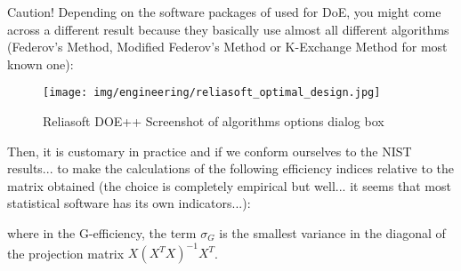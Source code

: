 	\begin{tcolorbox}[title=Remark,colframe=black,arc=10pt]
	Caution! Depending on the software packages of used for DoE, you might come across a different result because they basically use almost all different algorithms (Federov's Method, Modified Federov's Method or K-Exchange Method for most known one):
	\begin{figure}[H]
		\centering
		\texttt{[image: img/engineering/reliasoft\_optimal\_design.jpg]}
		\caption[]{Reliasoft DOE++ Screenshot of algorithms options dialog box}
	\end{figure}
	\end{tcolorbox}
	Then, it is customary in practice and if we conform ourselves to the NIST results... to make the calculations of the following efficiency indices relative to the matrix obtained (the choice is completely empirical but well... it seems that most statistical software has its own indicators...):
	
	where in the G-efficiency, the term $\sigma_G$ is the smallest variance in the diagonal of the projection matrix $X(X^TX)^{-1}X^T$.
 
